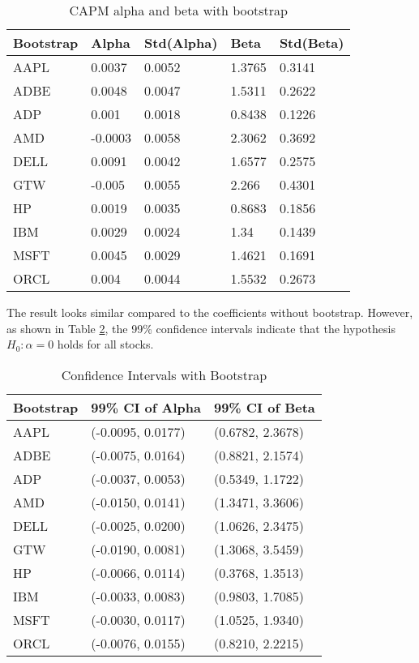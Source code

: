 \documentclass[11pt, conference]{IEEEtran}
\begin{document}
\begin{table}[!t]
\centering
\caption{CAPM alpha and beta with bootstrap}
\label{tab3}
\begin{tabular}{lllll}
\hline
Bootstrap & Alpha   & Std(Alpha) & Beta   & Std(Beta) \\
\hline
AAPL      & 0.0037  & 0.0052     & 1.3765 & 0.3141    \\
ADBE      & 0.0048  & 0.0047     & 1.5311 & 0.2622    \\
ADP       & 0.001   & 0.0018     & 0.8438 & 0.1226    \\
AMD       & -0.0003 & 0.0058     & 2.3062 & 0.3692    \\
DELL      & 0.0091  & 0.0042     & 1.6577 & 0.2575    \\
GTW       & -0.005  & 0.0055     & 2.266  & 0.4301    \\
HP        & 0.0019  & 0.0035     & 0.8683 & 0.1856    \\
IBM       & 0.0029  & 0.0024     & 1.34   & 0.1439    \\
MSFT      & 0.0045  & 0.0029     & 1.4621 & 0.1691    \\
ORCL      & 0.004   & 0.0044     & 1.5532 & 0.2673  \\
\hline 
\end{tabular}
\end{table}

The result looks similar compared to the coefficients without bootstrap. However, as shown in Table \ref{tab4}, the 99\% confidence intervals indicate that the hypothesis $H_0: \alpha = 0$ holds for all stocks. 

\begin{table}[!t]
\centering
\caption{Confidence Intervals with Bootstrap}
\label{tab4}
\begin{tabular}{lll}
\hline
Bootstrap & 99\% CI of Alpha  & 99\% CI of Beta  \\
\hline
AAPL      & (-0.0095, 0.0177) & (0.6782, 2.3678) \\
ADBE      & (-0.0075, 0.0164) & (0.8821, 2.1574) \\
ADP       & (-0.0037, 0.0053) & (0.5349, 1.1722) \\
AMD       & (-0.0150, 0.0141) & (1.3471, 3.3606) \\
DELL      & (-0.0025, 0.0200) & (1.0626, 2.3475) \\
GTW       & (-0.0190, 0.0081) & (1.3068, 3.5459) \\
HP        & (-0.0066, 0.0114) & (0.3768, 1.3513) \\
IBM       & (-0.0033, 0.0083) & (0.9803, 1.7085) \\
MSFT      & (-0.0030, 0.0117) & (1.0525, 1.9340) \\
ORCL      & (-0.0076, 0.0155) & (0.8210, 2.2215) \\
\hline
\end{tabular}
\end{table}
\end{document}

